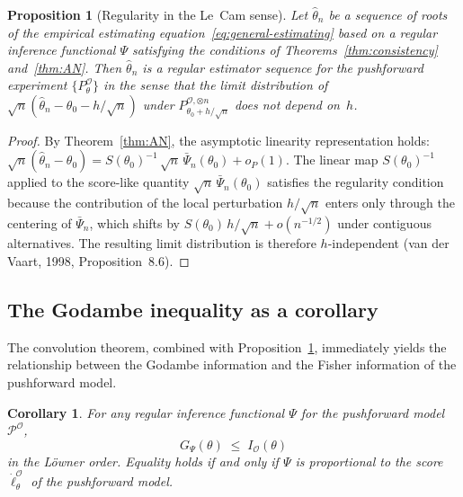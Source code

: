 \documentclass[11pt,a4paper]{article}
\newtheorem{proposition}[theorem]{Proposition}
\newtheorem{corollary}[theorem]{Corollary}
\begin{document}
\begin{proposition}[Regularity in the Le~Cam sense]\label{prop:regularity-bridge}
Let $\hat\theta_n$ be a sequence of roots of the empirical estimating
equation~\eqref{eq:general-estimating} based on a regular inference
functional $\Psi$ satisfying the conditions of
Theorems~\ref{thm:consistency} and~\ref{thm:AN}.  Then $\hat\theta_n$ is
a regular estimator sequence for the pushforward experiment
$\{P_\theta^{\mathcal O}\}$ in the sense that the limit distribution of
$\sqrt{n}(\hat\theta_n - \theta_0 - h/\sqrt{n})$ under
$P_{\theta_0+h/\sqrt{n}}^{\mathcal O,\otimes n}$ does not depend on~$h$.
\end{proposition}

\begin{proof}
By Theorem~\ref{thm:AN}, the asymptotic linearity representation holds:
$\sqrt{n}(\hat\theta_n - \theta_0)
= S(\theta_0)^{-1}\,\sqrt{n}\,\bar\Psi_n(\theta_0) + o_P(1)$.
The linear map $S(\theta_0)^{-1}$ applied to the score-like quantity
$\sqrt{n}\,\bar\Psi_n(\theta_0)$ satisfies the regularity condition because
the contribution of the local perturbation $h/\sqrt{n}$ enters only through
the centering of $\bar\Psi_n$, which shifts by
$S(\theta_0)\,h/\sqrt{n} + o(n^{-1/2})$ under contiguous alternatives.
The resulting limit distribution is therefore $h$-independent (van der Vaart,
1998, Proposition~8.6).
\end{proof}

\subsection{The Godambe inequality as a corollary}\label{subsec:godambe-corollary}

The convolution theorem, combined with
Proposition~\ref{prop:regularity-bridge}, immediately yields the
relationship between the Godambe information and the Fisher information
of the pushforward model.

\begin{corollary}\label{cor:G-leq-I}
For any regular inference functional $\Psi$ for the pushforward model
$\mathcal P^{\mathcal O}$,
\begin{equation}\label{eq:G-leq-I}
G_\Psi(\theta) \;\leq\; I_{\mathcal O}(\theta)
\end{equation}
in the L\"owner order.  Equality holds if and only if $\Psi$ is
proportional to the score $\dot\ell_\theta^{\mathcal O}$ of the pushforward
model.
\end{corollary}
\end{document}
